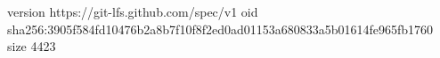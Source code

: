 version https://git-lfs.github.com/spec/v1
oid sha256:3905f584fd10476b2a8b7f10f8f2ed0ad01153a680833a5b01614fe965fb1760
size 4423

